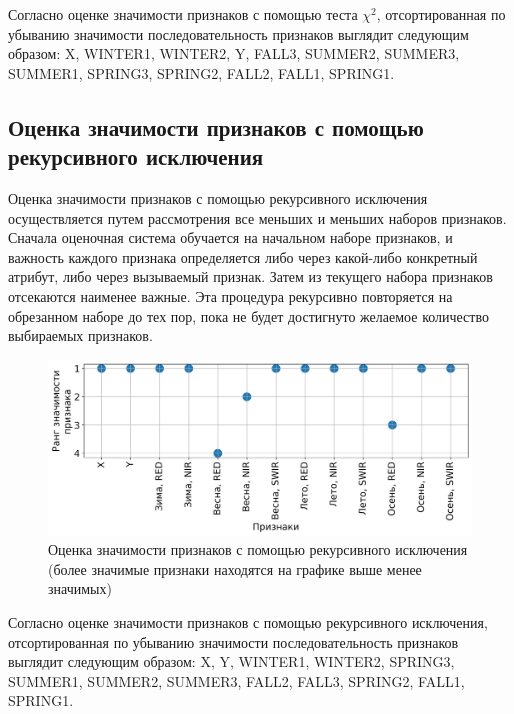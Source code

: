\documentclass[14pt, a4paper, oneside]{extarticle}
\begin{document}
Согласно оценке значимости признаков с помощью теста $\chi^2$, отсортированная по убыванию значимости последовательность признаков выглядит следующим образом: X, WINTER1, WINTER2, Y, FALL3, SUMMER2, SUMMER3, SUMMER1, SPRING3, SPRING2, FALL2, FALL1, SPRING1.

\subsection{Оценка значимости признаков с помощью рекурсивного исключения}

Оценка значимости признаков с помощью рекурсивного исключения осуществляется путем рассмотрения все меньших и меньших наборов признаков. Сначала оценочная система обучается на начальном наборе признаков, и важность каждого признака определяется либо через какой-либо конкретный атрибут, либо через вызываемый признак. Затем из текущего набора признаков отсекаются наименее важные. Эта процедура рекурсивно повторяется на обрезанном наборе до тех пор, пока не будет достигнуто желаемое количество выбираемых признаков.

\begin{figure}[H]
    \caption{Оценка значимости признаков с помощью рекурсивного исключения (более значимые признаки находятся на графике выше менее значимых)}
    \centering
    \includegraphics[scale=0.6]{rfe-selector-feature-ranking}
\end{figure}
\newpage

Согласно оценке значимости признаков с помощью рекурсивного исключения, отсортированная по убыванию значимости последовательность признаков выглядит следующим образом: X, Y, WINTER1, WINTER2, SPRING3, SUMMER1, SUMMER2, SUMMER3, FALL2, FALL3, SPRING2, FALL1, SPRING1.
\end{document}
